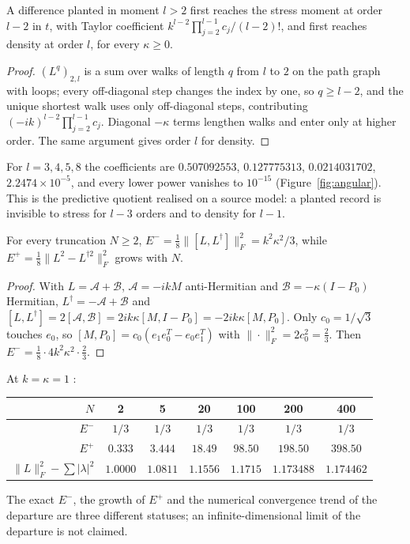 \begin{proposition}\label{prop:ang3}
A difference planted in moment $l>2$ first reaches the stress moment at order $l-2$ in $t$, with Taylor coefficient $k^{l-2}\prod_{j=2}^{l-1}c_j/(l-2)!$, and first reaches density at order $l$, for every $\kappa\ge0$. 
\end{proposition}
\begin{proof}
$(L^q)_{2,l}$ is a sum over walks of length $q$ from $l$ to $2$ on the path graph with loops; every off-diagonal step changes the index by one, so $q\ge l-2$, and the unique shortest walk uses only off-diagonal steps, contributing $(-ik)^{l-2}\prod_{j=2}^{l-1}c_j$. Diagonal $-\kappa$ terms lengthen walks and enter only at higher order. The same argument gives order $l$ for density.
\end{proof}
For $l=3,4,5,8$ the coefficients are $0.507092553$, $0.127775313$, $0.0214031702$, $2.2474\times10^{-5}$, and every lower power vanishes to $10^{-15}$  (Figure~\ref{fig:angular}). This is the predictive quotient realised on a source model: a planted record is invisible to stress for $l-3$ orders and to density for $l-1$.

\begin{proposition}\label{prop:ang4}
For every truncation $N\ge2$, $E^-=\tfrac18\|[L,L^\dagger]\|_F^2=k^2\kappa^2/3$, while $E^+=\tfrac18\|L^2-L^{\dagger2}\|_F^2$ grows with $N$. 
\end{proposition}
\begin{proof}
With $L=\mathcal A+\mathcal B$, $\mathcal A=-ikM$ anti-Hermitian and $\mathcal B=-\kappa(I-P_0)$ Hermitian, $L^\dagger=-\mathcal A+\mathcal B$ and $[L,L^\dagger]=2[\mathcal A,\mathcal B]=2ik\kappa[M,I-P_0]=-2ik\kappa[M,P_0]$. Only $c_0=1/\sqrt3$ touches $e_0$, so $[M,P_0]=c_0(e_1e_0^T-e_0e_1^T)$ with $\|\cdot\|_F^2=2c_0^2=\tfrac23$. Then $E^-=\tfrac18\cdot4k^2\kappa^2\cdot\tfrac23$.
\end{proof}
At $k=\kappa=1$ :
\begin{center}\small
\begin{tabular}{rcccccc}\toprule
$N$ & 2 & 5 & 20 & 100 & 200 & 400\\\midrule
$E^-$ & $1/3$ & $1/3$ & $1/3$ & $1/3$ & $1/3$ & $1/3$\\
$E^+$ & $0.333$ & $3.444$ & $18.49$ & $98.50$ & $198.50$ & $398.50$\\
$\|L\|_F^2-\sum|\lambda|^2$ & $1.0000$ & $1.0811$ & $1.1556$ & $1.1715$ & $1.173488$ & $1.174462$\\\bottomrule
\end{tabular}
\end{center} The exact $E^-$, the growth of $E^+$ and the numerical convergence trend of the departure are three different statuses; an infinite-dimensional limit of the departure is not claimed.


